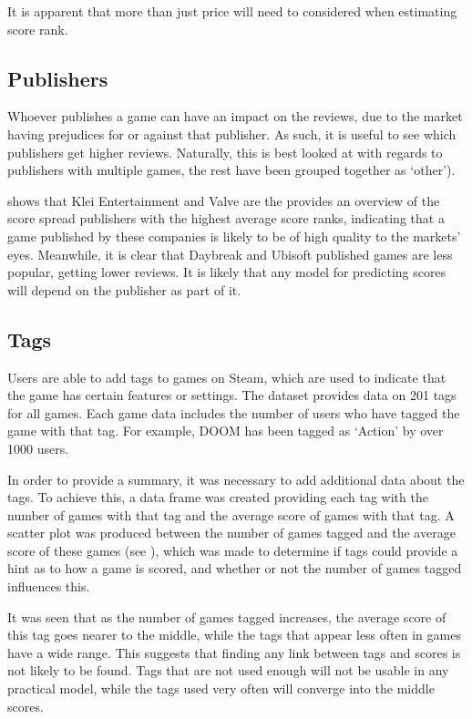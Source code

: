 \documentclass[dataset.tex]{subfiles}
\begin{document}
It is apparent that more than just price will need to considered when estimating
score rank.

\subsection{Publishers} %
\label{sub:publishers}
Whoever publishes a game can have an impact on the reviews, due to the market
having prejudices for or against that publisher. As such, it is useful to see
which publishers get higher reviews. Naturally, this is best looked at with
regards to publishers with multiple games, the rest have been grouped together
as `other').

 shows that Klei Entertainment and Valve are the
provides an overview of the score spread publishers with the highest average
score ranks, indicating that a game published by these companies is likely to be
of high quality to the markets' eyes. Meanwhile, it is clear that Daybreak and
Ubisoft published games are less popular, getting lower reviews. It is likely
that any model for predicting scores will depend on the publisher as part of it.

\subsection{Tags} %
\label{sub:tags}
Users are able to add tags to games on Steam, which are used to indicate that
the game has certain features or settings. The dataset provides data on 201
tags for all games. Each game data includes the number of users who have tagged
the game with that tag. For example, DOOM has been tagged as `Action' by over
1000 users. 

In order to provide a summary, it was necessary to add additional data about the
tags. To achieve this, a data frame was created providing each tag with the
number of games with that tag and the average score of games with that tag.
A scatter plot was produced between the number of games tagged and the average
score of these games (see ), which was made to determine
if tags could provide a hint as to how a game is scored, and whether or not the
number of games tagged influences this.

It was seen that as the number of games tagged increases, the average score of
this tag goes nearer to the middle, while the tags that appear less often in
games have a wide range. This suggests that finding any link between tags and
scores is not likely to be found. Tags that are not used enough will not be
usable in any practical model, while the tags used very often will converge into
the middle scores.
\end{document}
